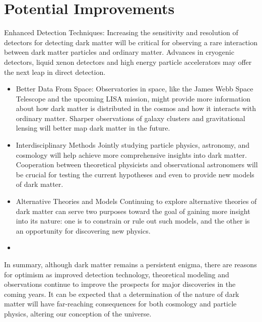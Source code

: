  
\section{Potential Improvements}
Enhanced Detection Techniques: Increasing the sensitivity and resolution of detectors for detecting dark matter will be critical for observing a rare interaction between dark matter particles and ordinary matter. Advances in cryogenic detectors, liquid xenon detectors and high energy particle accelerators may offer the next leap in direct detection.

\begin{itemize}
    \item Better Data From Space: Observatories in space, like the James Webb Space Telescope and the upcoming LISA mission, might provide more information about how dark matter is distributed in the cosmos and how it interacts with ordinary matter. Sharper observations of galaxy clusters and gravitational lensing will better map dark matter in the future.

    \item Interdisciplinary Methods Jointly studying particle physics, astronomy, and cosmology will help achieve more comprehensive insights into dark matter. Cooperation between theoretical physicists and observational astronomers will be crucial for testing the current hypotheses and even to provide new models of dark matter.

    \item Alternative Theories and Models Continuing to explore alternative theories of dark matter can serve two purposes toward the goal of gaining more insight into its nature: one is to constrain or rule out such models, and the other is an opportunity for discovering new physics.
    \item 
\end{itemize}
In summary, although dark matter remains a persistent enigma, there are reasons for optimism as improved detection technology, theoretical modeling and observations continue to improve the prospects for major discoveries in the coming years. It can be expected that a determination of the nature of dark matter will have far-reaching consequences for both cosmology and particle physics, altering our conception of the universe.

 